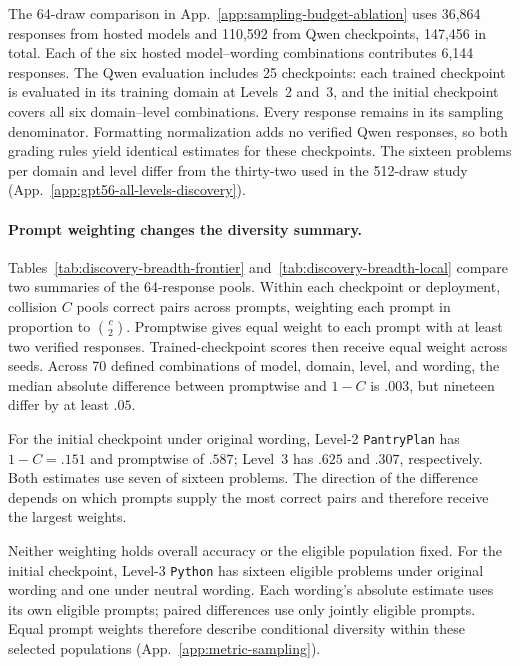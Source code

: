 The 64-draw comparison in App.~\ref{app:sampling-budget-ablation} uses
36,864 responses from hosted models and 110,592 from Qwen checkpoints,
147,456 in total. Each of the six hosted model--wording combinations
contributes 6,144 responses. The Qwen evaluation includes 25 checkpoints:
each trained checkpoint is evaluated in its training domain at Levels~2
and~3, and the initial checkpoint covers all six domain--level combinations.
Every response remains in its sampling denominator. Formatting normalization
adds no verified Qwen responses, so both grading rules yield identical
estimates for these checkpoints. The sixteen problems per domain and level
differ from the thirty-two used in the 512-draw study
(App.~\ref{app:gpt56-all-levels-discovery}).

\paragraph{Prompt weighting changes the diversity summary.}
Tables~\ref{tab:discovery-breadth-frontier} and~\ref{tab:discovery-breadth-local}
compare two summaries of the 64-response pools. Within each checkpoint or
deployment, collision $C$ pools correct pairs across prompts, weighting each
prompt in proportion to $\binom{c}{2}$. Promptwise \pmd{} gives equal weight
to each prompt with at least two verified responses. Trained-checkpoint
scores then receive equal weight across seeds. Across 70 defined
combinations of model, domain, level, and wording, the median absolute
difference between promptwise \pmd{} and $1-C$ is $.003$, but nineteen
differ by at least $.05$.

For the initial checkpoint under original wording,
Level-2 \texttt{PantryPlan} has $1-C=.151$ and promptwise \pmd{} of $.587$;
Level~3 has $.625$ and $.307$, respectively. Both estimates use seven of
sixteen problems. The direction of the difference depends on which prompts
supply the most correct pairs and therefore receive the largest weights.

Neither weighting holds overall accuracy or the eligible population fixed.
For the initial checkpoint, Level-3 \texttt{Python} has sixteen eligible
problems under original wording and one under neutral wording. Each wording's
absolute estimate uses its own eligible prompts; paired differences use
only jointly eligible prompts. Equal prompt weights therefore describe
conditional diversity within these selected populations
(App.~\ref{app:metric-sampling}).

